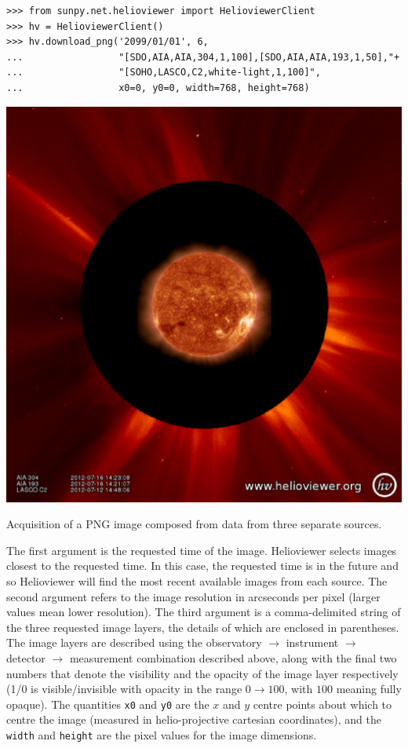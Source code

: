\begin{listing}[H]
\begin{verbatim}
>>> from sunpy.net.helioviewer import HelioviewerClient
>>> hv = HelioviewerClient()
>>> hv.download_png('2099/01/01', 6,
...                 "[SDO,AIA,AIA,304,1,100],[SDO,AIA,AIA,193,1,50],"+
...                 "[SOHO,LASCO,C2,white-light,1,100]",
...                 x0=0, y0=0, width=768, height=768)
\end{verbatim}
\begin{center}
\includegraphics[width=0.8\columnwidth]{helioviewer_overlay_example}
\end{center}
\caption{Acquisition of a PNG image composed from data from three
  separate sources.}
\label{code:hv:overlaid}
\end{listing}

The first argument is the requested time of the image.  Helioviewer
selects images closest to the requested time.  In this case, the
requested time is in the future and so Helioviewer will find the most
recent available images from each source.  The second argument refers
to the image resolution in arcseconds per pixel (larger values mean
lower resolution).  The third argument is a comma-delimited string of
the three requested image layers, the details of which are enclosed
in parentheses. The image layers are described using the observatory
$\rightarrow$ instrument $\rightarrow$ detector $\rightarrow$
measurement combination described above, along with the final two
numbers that denote the visibility and the opacity of the image layer
respectively (1/0 is visible/invisible with opacity in the range
$0\rightarrow100$, with $100$ meaning fully opaque).  The quantities
\texttt{x0} and \texttt{y0} are the $x$ and $y$ centre points about
which to centre the image (measured in helio-projective cartesian
coordinates), and the \texttt{width} and \texttt{height} are the pixel
values for the image dimensions.

